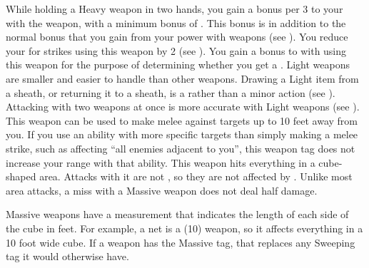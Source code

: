     While holding a Heavy weapon in two hands, you gain a  bonus per 3  to your  with the weapon, with a minimum bonus of .
    This bonus is in addition to the normal bonus that you gain from your power with weapons (see ).
     You reduce your  for strikes using this weapon by 2 (see ).
     You gain a  bonus to  with  using this weapon for the purpose of determining whether you get a .
     Light weapons are smaller and easier to handle than other weapons.
    Drawing a Light item from a sheath, or returning it to a sheath, is a  rather than a minor action (see ).
    Attacking with two weapons at once is more accurate with Light weapons (see ).
    \label{Long Weapon} This weapon can be used to make melee  against targets up to 10 feet away from you.
    If you use an ability with more specific targets than simply making a melee strike, such as affecting ``all enemies adjacent to you'', this weapon tag does not increase your range with that ability.
     This weapon hits everything in a cube-shaped area.
    Attacks with it are not , so they are not affected by .
    Unlike most area attacks, a miss with a Massive weapon does not deal half damage.

    Massive weapons have a measurement that indicates the length of each side of the cube in feet.
    For example, a net is a  (10) weapon, so it affects everything in a 10 foot wide cube.
    If a weapon has the Massive tag, that replaces any Sweeping tag it would otherwise have.

